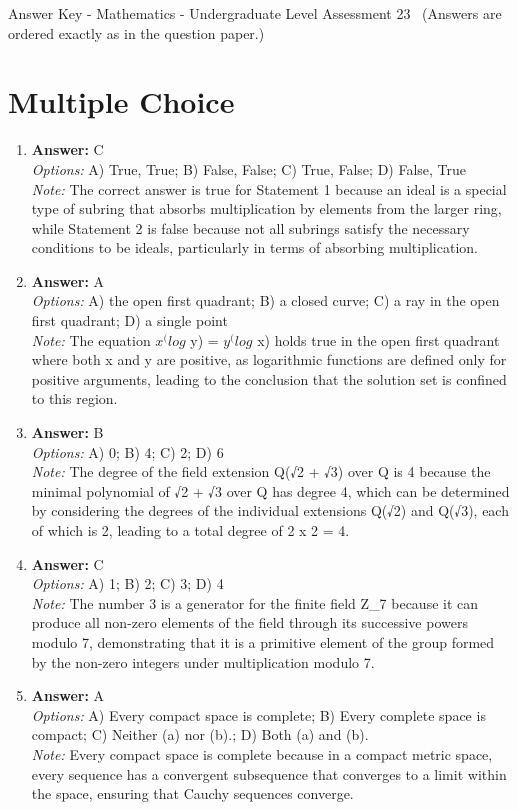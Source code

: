 \documentclass[12pt]{article}
\begin{document}
\begin{center}
Answer Key - Mathematics - Undergraduate Level Assessment 23 \
\small (Answers are ordered exactly as in the question paper.)
\end{center}

\section*{Multiple Choice}
\begin{enumerate}[label=\arabic*.]
\item \textbf{Answer:} C
\\ \textit{Options:} A) True, True; B) False, False; C) True, False; D) False, True
\\ \textit{Note:} The correct answer is true for Statement 1 because an ideal is a special type of subring that absorbs multiplication by elements from the larger ring, while Statement 2 is false because not all subrings satisfy the necessary conditions to be ideals, particularly in terms of absorbing multiplication.
\item \textbf{Answer:} A
\\ \textit{Options:} A) the open first quadrant; B) a closed curve; C) a ray in the open first quadrant; D) a single point
\\ \textit{Note:} The equation $x^(log$ y) = $y^(log$ x) holds true in the open first quadrant where both x and y are positive, as logarithmic functions are defined only for positive arguments, leading to the conclusion that the solution set is confined to this region.
\item \textbf{Answer:} B
\\ \textit{Options:} A) 0; B) 4; C) 2; D) 6
\\ \textit{Note:} The degree of the field extension Q(√2 + √3) over Q is 4 because the minimal polynomial of √2 + √3 over Q has degree 4, which can be determined by considering the degrees of the individual extensions Q(√2) and Q(√3), each of which is 2, leading to a total degree of 2 x 2 = 4.
\item \textbf{Answer:} C
\\ \textit{Options:} A) 1; B) 2; C) 3; D) 4
\\ \textit{Note:} The number 3 is a generator for the finite field Z\_7 because it can produce all non-zero elements of the field through its successive powers modulo 7, demonstrating that it is a primitive element of the group formed by the non-zero integers under multiplication modulo 7.
\item \textbf{Answer:} A
\\ \textit{Options:} A) Every compact space is complete; B) Every complete space is compact; C) Neither (a) nor (b).; D) Both (a) and (b).
\\ \textit{Note:} Every compact space is complete because in a compact metric space, every sequence has a convergent subsequence that converges to a limit within the space, ensuring that Cauchy sequences converge.
\end{enumerate}
\end{document}
